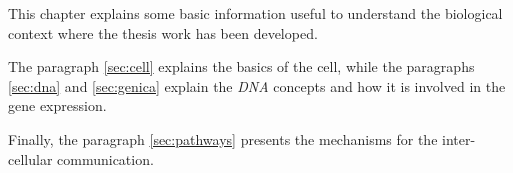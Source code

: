 This chapter explains some basic information useful to understand the biological context where the thesis work has been developed.

The paragraph \ref{sec:cell} explains the basics of the cell, while the paragraphs \ref{sec:dna} and \ref{sec:genica} explain the \textit{DNA} concepts and how it is involved in the gene expression.

Finally, the paragraph \ref{sec:pathways} presents the mechanisms for the inter-cellular communication.